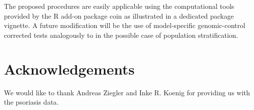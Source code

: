 \documentclass[bimj,fleqn]{w-art}
\newcommand{\Rpackage}[1]{{\normalfont\fontseries{b}\selectfont #1}}
\begin{document}
The proposed procedures are easily 
applicable using the computational tools provided by the \textsf{R} 
add-on package \Rpackage{coin} as illustrated in a dedicated package vignette. A future modification will be 
the use of model-specific genomic-control corrected tests 
analogously to \citet{Zang:2007} in the possible case of 
population stratification.

\section{Acknowledgements} 
We would like to thank Andreas Ziegler and Inke R. Koenig for providing 
us with the psoriasis data.



\end{document}
